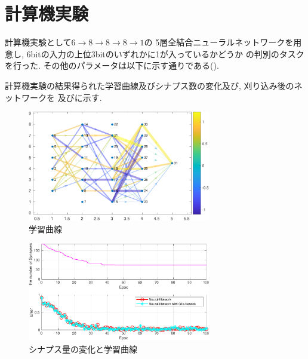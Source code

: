 \documentclass[a4paper, 9pt,twocolumn,dvipdfmx]{jsarticle}
\begin{document}
\section{計算機実験}
計算機実験として$6\rightarrow 8\rightarrow 8\rightarrow 8\rightarrow 1$の
5層全結合ニューラルネットワークを用意し, 
6bitの入力の上位3bitのいずれかに1が入っているかどうか
の判別のタスクを行った.
その他のパラメータは以下に示す通りである().
\vspace{-0.5cm}
\begin{table}[H]
  \caption{パラメータ一覧}
  \label{tab:param}
  \centering
 \end{table}
計算機実験の結果得られた学習曲線及びシナプス数の変化及び, 刈り込み後のネットワークを
及びに示す.
\begin{figure}[H]
  \centering
  \includegraphics[width=8cm]{Graph-crop.pdf} 
  \caption{学習曲線}
  \label{fig:Graph}
\end{figure}
\vspace{-2zh}
\begin{figure}[H]
  \centering
  \includegraphics[width=8cm]{Subploting-crop.pdf} 
  \caption{シナプス量の変化と学習曲線}
  \label{fig:SynapseNum}
\end{figure}
\vspace{-2zh}
\end{document}
